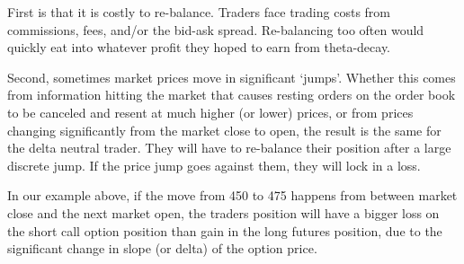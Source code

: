 \documentclass[
  letterpaper,
  DIV=11,
  numbers=noendperiod]{scrreprt}
\begin{document}
First is that it is costly to re-balance. Traders face trading costs
from commissions, fees, and/or the bid-ask spread. Re-balancing too
often would quickly eat into whatever profit they hoped to earn from
theta-decay.

Second, sometimes market prices move in significant `jumps'. Whether
this comes from information hitting the market that causes resting
orders on the order book to be canceled and resent at much higher (or
lower) prices, or from prices changing significantly from the market
close to open, the result is the same for the delta neutral trader. They
will have to re-balance their position after a large discrete jump. If
the price jump goes against them, they will lock in a loss.

In our example above, if the move from 450 to 475 happens from between
market close and the next market open, the traders position will have a
bigger loss on the short call option position than gain in the long
futures position, due to the significant change in slope (or delta) of
the option price.
\end{document}
